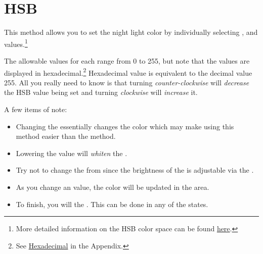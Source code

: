 
\section{HSB} 

This method allows you to set the night light color by individually selecting
,  and  values.\footnote{ More detailed
information on the HSB color space can be found
\href{https://en.wikipedia.org/wiki/HSL\_and\_HSV}{here}.}

\par\medskip

The allowable values for each range from \num{0} to \num{255}, but note that the
values are displayed in hexadecimal.\footnote{ See
\hyperref[Hexadecimal]{Hexadecimal} in the Appendix.} Hexadecimal value
 is equivalent to the decimal value \num{255}. All you really need to
know is that turning \textit{counter-clockwise} will \textit{decrease} the
HSB value being set and turning \textit{clockwise} will \textit{increase} it.

\par\medskip

A few items of note:

\begin{itemize}
  \item Changing the  essentially changes the color which may make
    using this method easier than the  method.
  \item Lowering the  value will \textit{whiten} the .
  \item Try not to change the  from  since the
    brightness of the  is adjustable via the .
  \item As you change an  value, the color will be updated in the
     area.
  \item To finish, you will  the .  This can be done
    in any of the  states.
\end{itemize}

